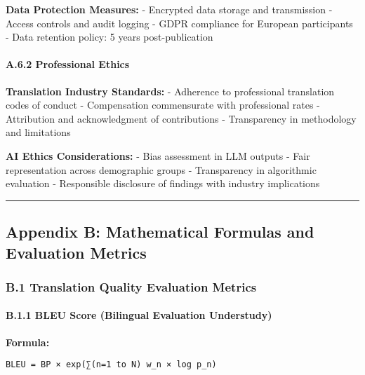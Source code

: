 \documentclass[12pt,a4paper]{article}
\begin{document}
{{{{{\textbf{Data Protection Measures:} - Encrypted data storage and
transmission - Access controls and audit logging - GDPR compliance for
European participants - Data retention policy: 5 years post-publication

\hypertarget{a.6.2-professional-ethics}{%
\paragraph{A.6.2 Professional Ethics}\label{a.6.2-professional-ethics}}

\textbf{Translation Industry Standards:} - Adherence to professional
translation codes of conduct - Compensation commensurate with
professional rates - Attribution and acknowledgment of contributions -
Transparency in methodology and limitations

\textbf{AI Ethics Considerations:} - Bias assessment in LLM outputs -
Fair representation across demographic groups - Transparency in
algorithmic evaluation - Responsible disclosure of findings with
industry implications

\begin{center}\rule{0.5\linewidth}{0.5pt}\end{center}

\hypertarget{appendix-b-mathematical-formulas-and-evaluation-metrics}{%
\subsection{Appendix B: Mathematical Formulas and Evaluation
Metrics}\label{appendix-b-mathematical-formulas-and-evaluation-metrics}}

\hypertarget{b.1-translation-quality-evaluation-metrics}{%
\subsubsection{B.1 Translation Quality Evaluation
Metrics}\label{b.1-translation-quality-evaluation-metrics}}

\hypertarget{b.1.1-bleu-score-bilingual-evaluation-understudy}{%
\paragraph{B.1.1 BLEU Score (Bilingual Evaluation
Understudy)}\label{b.1.1-bleu-score-bilingual-evaluation-understudy}}

\textbf{Formula:}

\begin{verbatim}
BLEU = BP × exp(∑(n=1 to N) w_n × log p_n)
\end{verbatim}

}}}}}
\end{document}
